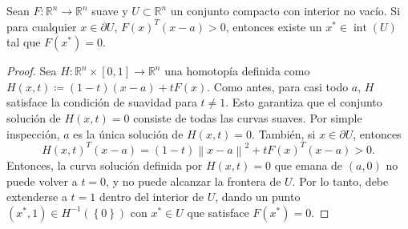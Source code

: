 \begin{frame}
	\begin{theorem}
		Sean
		\begin{math}
			F\colon\mathbb{R}^{n}\to\mathbb{R}^{n}
		\end{math}
		suave y $U\subset\mathbb{R}^{n}$ un conjunto compacto con
		interior no vacío.
		Si para cualquier $x\in\partial U$, ${F\left(x\right)}^{T}\left(x-a\right)>0$,
		entonces existe un $x^{\ast}\in\operatorname{int}\left(U\right)$ tal que
		$F\left(x^{\ast}\right)=0$.
	\end{theorem}

	\begin{proof}
		Sea
		\begin{math}
			H\colon
			\mathbb{R}^{n}\times\left[0,1\right]\to
			\mathbb{R}^{n}
		\end{math}
		una homotopía definida como
		\begin{math}
			H\left(x,t\right)\coloneqq
			\left(1-t\right)\left(x-a\right)+
			tF\left(x\right).
		\end{math}
		Como antes, para casi todo $a$, $H$ satisface la condición de
		suavidad para $t\neq 1$.
		Esto garantiza que el conjunto solución de $H\left(x,t\right)=0$
		consiste de todas las curvas suaves.
		Por simple inspección, $a$ es la única solución de $H\left(x,t\right)=0$.
		También, si $x\in\partial U$, entonces
		\begin{equation*}
			{H\left(x,t\right)}^{T}\left(x-a\right)=
			\left(1-t\right){\left\|x-a\right\|}^{2}+
			t{F\left(x\right)}^{T}\left(x-a\right)>0.
		\end{equation*}
		Entonces, la curva solución definida por $H\left(x,t\right)=0$
		que emana de $\left(a,0\right)$ no puede volver a $t=0$, y no
		puede alcanzar la frontera de $U$.
		Por lo tanto, debe extenderse a $t=1$ dentro del interior de $U$,
		dando un punto
		\begin{math}
			\left(x^{\ast},1\right)\in
			H^{-1}\left(\left\{0\right\}\right)
		\end{math}
		con $x^{\ast}\in U$ que satisface $F\left(x^{\ast}\right)=0$.
	\end{proof}
\end{frame}

